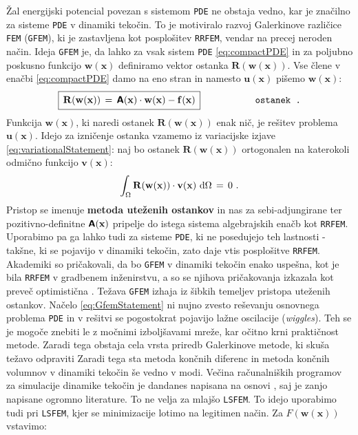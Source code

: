 Žal energijski potencial povezan s sistemom \texttt{PDE} ne obstaja vedno, kar je značilno za sisteme \texttt{PDE} v dinamiki tekočin. To je motiviralo razvoj Galerkinove različice \texttt{FEM} (\texttt{GFEM}), ki je zastavljena kot posplošitev \texttt{RRFEM}, vendar na precej neroden način. Ideja \texttt{GFEM} je, da lahko za vsak sistem \texttt{PDE} \eqref{eq:compactPDE} in za poljubno poskusno funkcijo $\mathbf{w(x)}$ definiramo vektor ostanka $\mathbf{R(w(x))}$. Vse člene v enačbi \eqref{eq:compactPDE} damo na eno stran in namesto $\mathbf{u(x)}$ pišemo $\mathbf{w(x)}$:
\begin{equation}
	\hspace{0mm} \boxed{\, \vphantom{\big(}
		\mathbf{R(w(x))} \, = \, \mathbsf{A}(\mathbf{x}) \cdot \mathbf{w(x)} - \mathbf{f(x)} \,
	}\hspace{20mm} \texttt{ostanek .}
	\label{eq:residual}
\end{equation}
Funkcija $\mathbf{w(x)}$, ki naredi ostanek $\mathbf{R(w(x))}$ enak nič, je rešitev problema $\mathbf{u(x)}$. Idejo za izničenje ostanka vzamemo iz variacijske izjave \eqref{eq:variationalStatement}: naj bo ostanek $\mathbf{R(w(x))}$ ortogonalen na katerokoli odmično funkcijo $\mathbf{v(x)}$:
\begin{equation}
	\int_{\Omega} \mathbf{R(w(x))} \cdot \mathbf{v(x)} \ \mathrm{d} \Omega \, = \, 0 \ .
	\label{eq:GfemStatement}
\end{equation}
Pristop se imenuje \textbf{metoda uteženih ostankov} in nas za sebi-adjungirane ter pozitivno-definitne $\bm{\mathsf{A}}\mathbf{(x)}$ pripelje do istega sistema algebrajskih enačb kot \texttt{RRFEM}. Uporabimo pa ga lahko tudi za sisteme \texttt{PDE}, ki ne posedujejo teh lastnosti - takšne, ki se pojavijo v dinamiki tekočin, zato daje vtis posplošitve \texttt{RRFEM}. Akademiki so pričakovali, da bo \texttt{GFEM} v dinamiki tekočin enako uspešna, kot je bila \texttt{RRFEM} v gradbenem inženirstvu, a so se njihova pričakovanja izkazala kot preveč optimistična \cite{JiangB-LSFEM}. Težava \texttt{GFEM} izhaja iz šibkih temeljev pristopa uteženih ostankov. Načelo \eqref{eq:GfemStatement} ni nujno zvesto reševanju osnovnega problema \texttt{PDE} in v rešitvi se pogostokrat pojavijo lažne oscilacije (\emph{wiggles}). Teh se je mogoče znebiti le z močnimi izboljšavami mreže, kar očitno krni praktičnost metode. Zaradi tega obstaja cela vrsta priredb Galerkinove metode, ki skuša težavo odpraviti Zaradi tega sta metoda končnih diferenc in metoda končnih volumnov v dinamiki tekočin še vedno v modi. Večina računalniških programov za simulacije dinamike tekočin je dandanes napisana na osnovi , saj je zanjo napisane ogromno literature. To ne velja za mlajšo \texttt{LSFEM}.  To idejo uporabimo tudi pri \texttt{LSFEM}, kjer se minimizacije lotimo na legitimen način. Za $F(\mathbf{w(x)})$ vstavimo:
